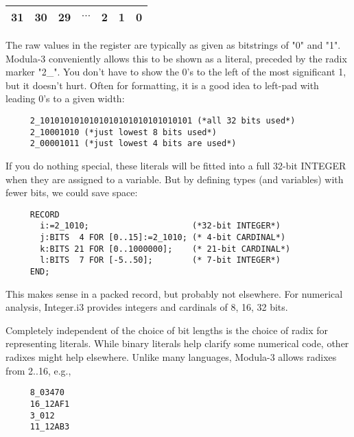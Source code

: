 \begin{center}
\begin{tabular}{|c|c|c|c|c|c|c|} \hline
    31 & 30 & 29 & $\cdots$ & 2 & 1 & 0 \\ \hline
\end{tabular}    
\end{center}

The raw values in the register are typically as given as
bitstrings of "0" and "1".  Modula-3 conveniently allows
this to be shown as a literal, preceded by the radix marker
"2\_".  You don't have to show the 0's to the left of the
most significant 1, but it doesn't hurt.  Often for
formatting, it is a good idea to left-pad with leading 0's
to a given width:

\begin{tt} \begin{verbatim}
     2_1010101010101010101010101010101 (*all 32 bits used*)
     2_10001010 (*just lowest 8 bits used*)
     2_00001011 (*just lowest 4 bits are used*)
\end{verbatim} \end{tt}

If you do nothing special, these literals will be fitted
into a full 32-bit INTEGER when they are assigned to a
variable.  But by defining types (and variables) with fewer
bits, we could save space:

\begin{tt} \begin{verbatim}
     RECORD
       i:=2_1010;                     (*32-bit INTEGER*)
       j:BITS  4 FOR [0..15]:=2_1010; (* 4-bit CARDINAL*)
       k:BITS 21 FOR [0..1000000];    (* 21-bit CARDINAL*)
       l:BITS  7 FOR [-5..50];        (* 7-bit INTEGER*)
     END;
\end{verbatim} \end{tt}

This makes sense in a packed record, but probably not
elsewhere.  For numerical analysis, Integer.i3 provides integers
and cardinals of 8, 16, 32 bits.

Completely independent of the choice of bit lengths is the
choice of radix for representing literals.  While binary
literals help clarify some numerical code, other radixes
might help elsewhere.  Unlike many languages, Modula-3
allows radixes from 2..16, e.g.,
\begin{tt} \begin{verbatim}
     8_03470
     16_12AF1
     3_012
     11_12AB3
\end{verbatim} \end{tt}

